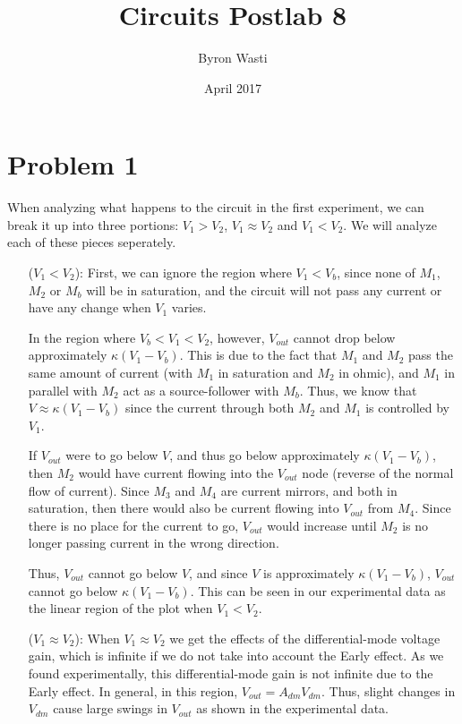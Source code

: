 \documentclass{article}
\title{Circuits Postlab 8}
\author{Byron Wasti}
\date{April 2017}
\begin{document}
\maketitle

\section{Problem 1}

When analyzing what happens to the circuit in the first experiment, we can break it up into three portions: $V_1 > V_2$, $V_1 \approx V_2$ and $V_1 < V_2$. We will analyze each of these pieces seperately.

\begin{itemize}

    \item [($V_1 < V_2$):]
        First, we can ignore the region where $V_1 < V_b$, since none of $M_1$, $M_2$ or $M_b$ will be in saturation, and the circuit will not pass any current or have any change when $V_1$ varies.
        
        In the region where $V_b < V_1 < V_2$, however, $V_{out}$ cannot drop below approximately $\kappa(V_1 -V_b)$. This is due to the fact that $M_1$ and $M_2$ pass the same amount of current (with $M_1$ in saturation and $M_2$ in ohmic), and $M_1$ in parallel with $M_2$ act as a source-follower with $M_b$. Thus, we know that $V \approx \kappa(V_1 - V_b)$ since the current through both $M_2$ and $M_1$ is controlled by $V_1$.

        If $V_{out}$ were to go below $V$, and thus go below approximately $\kappa(V_1 - V_b)$, then $M_2$ would have current flowing into the $V_{out}$ node (reverse of the normal flow of current). Since $M_3$ and $M_4$ are current mirrors, and both in saturation, then there would also be current flowing into $V_{out}$ from $M_4$. Since there is no place for the current to go, $V_{out}$ would increase until $M_2$ is no longer passing current in the wrong direction.

        Thus, $V_{out}$ cannot go below $V$, and since $V$ is approximately $\kappa(V_1 - V_b)$, $V_{out}$ cannot go below $\kappa(V_1 - V_b)$. This can be seen in our experimental data as the linear region of the plot when $V_1 < V_2$.

    \item [($V_1 \approx V_2$):] 
        When $V_1 \approx V_2$ we get the effects of the differential-mode voltage gain, which is infinite if we do not take into account the Early effect. As we found experimentally, this differential-mode gain is not infinite due to the Early effect. In general, in this region, $V_{out} = A_{dm} V_{dm}$. Thus, slight changes in $V_{dm}$ cause large swings in $V_{out}$ as shown in the experimental data.


\end{itemize}
\end{document}
